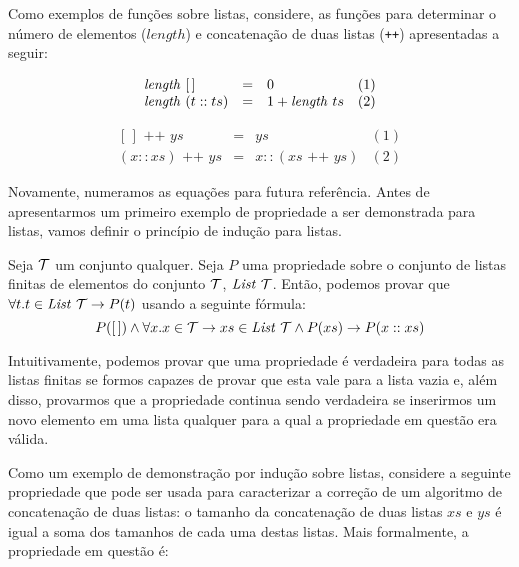 Como exemplos de funções sobre listas, considere, as funções para
determinar o número de elementos ($length$) e concatenação de duas
listas (\texttt{++}) apresentadas a seguir:

\[
\begin{array}{lclr}
  \textit{length\/}\,\,[\,] & = & 0 & (1)\\
  \textit{length\/}\,\,(t :: ts) & = & 1 + \textit{length\/}\,\, ts & (2)\\
\end{array}
\]

 \[
  \begin{array}{lclr}
    [\,] \text { ++ } ys & = & ys & (1)\\
    (x :: xs) \text{ ++ }  ys & = & x :: (xs\text{ ++ } ys) & (2)
  \end{array}
  \]

Novamente, numeramos as equações para futura referência. Antes de
apresentarmos um primeiro exemplo de propriedade a ser demonstrada
para listas, vamos definir o princípio de indução para listas.

\begin{Definition}
Seja $\mathcal{T}$ um conjunto qualquer. Seja $P$ uma propriedade sobre o
conjunto de listas finitas de elementos do conjunto $\mathcal{T}$,
$\textit{List\/}\,\,\mathcal{T}$. Então, podemos provar que $\forall
t. t\in\textit{List\/}\,\,\mathcal{T}\to P(t)$ usando a seguinte fórmula:
\[
P([\,])\land\forall x. x\in \mathcal{T} \to xs \in \textit{List\/}\,\,\mathcal{T} \land
P(xs) \to P(x :: xs)
\]
\end{Definition}
Intuitivamente, podemos provar que uma propriedade é verdadeira para
todas as listas finitas se formos capazes de provar que esta vale para
a lista vazia e, além disso,  provarmos que a propriedade continua
sendo verdadeira se inserirmos um novo elemento em uma lista qualquer
para a qual a propriedade em questão era válida.

Como um exemplo de demonstração por indução sobre listas,
considere a seguinte propriedade que pode ser usada para caracterizar
a correção de um algoritmo de concatenação de duas listas: o tamanho
da concatenação de duas listas $xs$ e $ys$ é igual a soma dos tamanhos
de cada uma destas listas. Mais formalmente, a propriedade em questão é:

